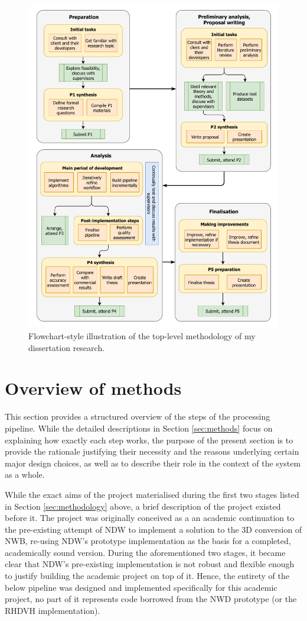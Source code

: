 \begin{figure}
    \centering
    \includegraphics[width=0.9\linewidth]{final_report/figs/methodology.pdf}
    \caption{Flowchart-style illustration of the top-level methodology of my dissertation research.}
    \label{fig:methodologyflow}
\end{figure}

\section{Overview of methods}
\label{sec:methodsoverview}

This section provides a structured overview of the steps of the processing pipeline. While the detailed descriptions in Section \ref{sec:methods} focus on explaining how exactly each step works, the purpose of the present section is to provide the rationale justifying their necessity and the reasons underlying certain major design choices, as well as to describe their role in the context of the system as a whole.

While the exact aims of the project materialised during the first two stages listed in Section \ref{sec:methodology} above, a brief description of the project existed before it. The project was originally conceived as a an academic continuation to the pre-existing attempt of NDW to implement a solution to the 3D conversion of NWB, re-using NDW's prototype implementation as the basis for a completed, academically sound version. During the aforementioned two stages, it became clear that NDW's pre-existing implementation is not robust and flexible enough to justify building the academic project on top of it. Hence, the entirety of the below pipeline was designed and implemented specifically for this academic project, no part of it represents code borrowed from the NWD prototype (or the RHDVH implementation).

